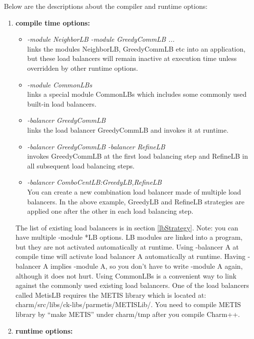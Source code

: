 Below are the descriptions about the compiler and runtime options:

\begin{enumerate}
\item {\bf compile time options:}

\begin{itemize}
\item {\em -module NeighborLB -module GreedyCommLB ...}  \\
  links the modules NeighborLB, GreedyCommLB etc into an application, but these
load balancers will remain inactive at execution time unless overridden by other
runtime options.
\item {\em -module CommonLBs} \\
  links a special module CommonLBs which includes some commonly used \charmpp{}
built-in load balancers.
\item {\em -balancer GreedyCommLB} \\
  links the load balancer GreedyCommLB and invokes it at runtime.
\item {\em -balancer GreedyCommLB -balancer RefineLB} \\
  invokes GreedyCommLB at the first load balancing step and RefineLB in all
subsequent load balancing steps.
\item {\em -balancer ComboCentLB:GreedyLB,RefineLB}  \\
  You can create a new combination load balancer made of multiple
load balancers. In the above example, GreedyLB and RefineLB strategies are
applied one after the other in each load balancing step.
\end{itemize}

The list of existing load balancers is in section \ref{lbStrategy}. Note: you
can have multiple -module *LB options. LB modules are linked into a program,
but they are not activated automatically at runtime.  Using -balancer A at
compile time will activate load balancer A automatically at runtime.
Having -balancer A implies -module A, so you don't have to write -module A
again, although it does not hurt.  Using CommonLBs is a convenient way to link
against the commonly used existing load balancers.  One of the load balancers
called MetisLB requires the METIS library which is located at:
charm/src/libs/ck-libs/parmetis/METISLib/.  You need to compile METIS library
by ``make METIS'' under charm/tmp after you compile Charm++.

\item {\bf runtime options:}


\end{enumerate}

